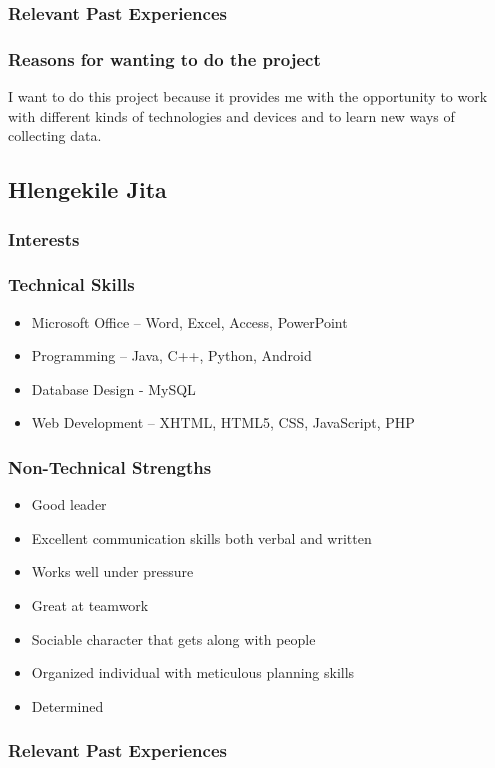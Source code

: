 \documentclass[a4paper,12pt]{article}
\begin{document}
\subsubsection{Relevant Past Experiences}
\subsubsection{Reasons for wanting to do the project}
I want to do this project because it provides me with the opportunity to work with different kinds of technologies and devices and to learn new ways of collecting data.
\subsection{Hlengekile Jita}
\subsubsection{Interests}
\subsubsection{Technical Skills}
\begin{itemize}
\item Microsoft Office – Word, Excel, Access, PowerPoint
\item Programming – Java, C++, Python, Android
\item Database Design - MySQL
\item Web Development – XHTML, HTML5, CSS, JavaScript, PHP
\end{itemize}
\subsubsection{Non-Technical Strengths}
\begin{itemize}
\item Good leader
\item Excellent communication skills both verbal and written
\item Works well under pressure
\item Great at teamwork
\item Sociable character that gets along with people
\item Organized individual with meticulous planning skills
\item Determined
\end{itemize}
\subsubsection{Relevant Past Experiences}
\end{document}
